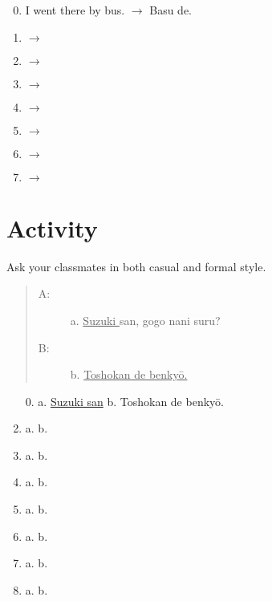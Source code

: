 \documentclass[uplatex,a4paper]{jsarticle}
\begin{document}
\begin{multicols}{2}
\begin{enumerate}
\setcounter{enumi}{-1}   
 \item I went there by bus. $\rightarrow$  Basu de. \hrulefill
 \item \underline{\hspace*{10em}} $\rightarrow$\hrulefill
 \item \underline{\hspace*{10em}} $\rightarrow$\hrulefill
 \item \underline{\hspace*{10em}} $\rightarrow$\hrulefill
 \item \underline{\hspace*{10em}} $\rightarrow$\hrulefill
 \item \underline{\hspace*{10em}} $\rightarrow$\hrulefill
 \item \underline{\hspace*{10em}} $\rightarrow$\hrulefill
 \item \underline{\hspace*{10em}} $\rightarrow$\hrulefill
\end{enumerate}
\end{multicols}

\section{Activity}

Ask your classmates in both casual and formal style.

\begin{quote}
\begin{description}
 \item[A:] a. \underline{ Suzuki } san, gogo nani suru?
 \item[B:] b. \underline{ Toshokan de benky\=o.}
\end{description}
\end{quote}
 
\begin{enumerate}
 \item[0.]  a. \underline{ Suzuki san\hspace{6.56zw}} b. Toshokan de benky\=o.\hrulefill
 \item  a. \underline{\hspace{12zw}} b. \hrulefill
 \item  a. \underline{\hspace{12zw}} b. \hrulefill
 \item  a. \underline{\hspace{12zw}} b. \hrulefill
 \item  a. \underline{\hspace{12zw}} b. \hrulefill
 \item  a. \underline{\hspace{12zw}} b. \hrulefill
 \item  a. \underline{\hspace{12zw}} b. \hrulefill
 \item  a. \underline{\hspace{12zw}} b. \hrulefill
\end{enumerate}
\end{document}
